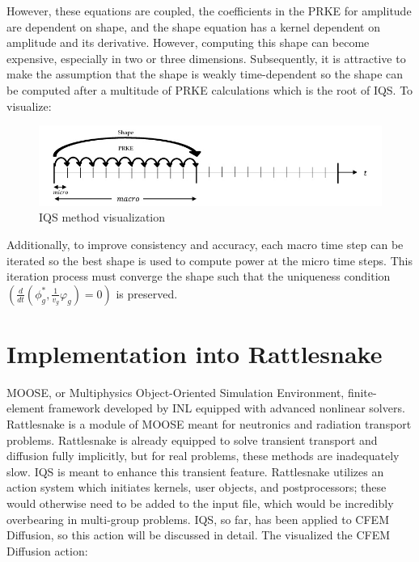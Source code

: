 \documentclass[12pt]{scrartcl}
\begin{document}
However, these equations are coupled, the coefficients in the PRKE for amplitude are dependent on shape, and the shape equation has a kernel dependent on amplitude and its derivative.  However, computing this shape can become expensive, especially in two or three dimensions.  Subsequently, it is attractive to make the assumption that the shape is weakly time-dependent so the shape can be computed after a multitude of PRKE calculations which is the root of IQS.  To visualize:
\begin{figure}[h]
\includegraphics[width=\linewidth]{IQS_visualization.jpg}
\caption{IQS method visualization}
\end{figure}
Additionally, to improve consistency and accuracy, each macro time step can be iterated so the best shape is used to compute power at the micro time steps.  This iteration process must converge the shape such that the uniqueness condition $(\frac{d}{dt}\left(\phi_g^*,\frac{1}{v_g}\varphi_g\right)=0)$ is preserved.

\newpage
\section{Implementation into Rattlesnake}
MOOSE, or Multiphysics Object-Oriented Simulation Environment, finite-element framework developed by INL equipped with advanced nonlinear solvers.  Rattlesnake is a module of MOOSE meant for neutronics and radiation transport problems.  Rattlesnake is already equipped to solve transient transport and diffusion fully implicitly, but for real problems, these methods are inadequately slow.  IQS is meant to enhance this transient feature.  Rattlesnake utilizes an action system which initiates kernels, user objects, and postprocessors; these would otherwise need to be added to the input file, which would be incredibly overbearing in multi-group problems.  IQS, so far, has been applied to CFEM Diffusion, so this action will be discussed in detail.  The visualized the CFEM Diffusion action: 
\end{document}
